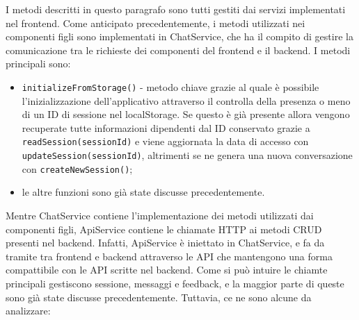 I metodi descritti in questo paragrafo sono tutti gestiti dai servizi implementati nel frontend.
Come anticipato precedentemente, i metodi utilizzati nei componenti figli sono implementati in ChatService, che ha il compito di gestire la comunicazione tra le richieste dei componenti del frontend e il backend. I metodi principali sono:
\begin{itemize}
    \item \texttt{initializeFromStorage()} - metodo chiave grazie al quale è possibile l'inizializzazione dell'applicativo attraverso il controlla della presenza o meno di un ID di sessione nel localStorage. Se questo è già presente allora vengono recuperate tutte informazioni dipendenti dal ID conservato grazie a \texttt{readSession(sessionId)} e viene aggiornata la data di accesso con \texttt{updateSession(sessionId)}, altrimenti se ne genera una nuova conversazione con \texttt{createNewSession()};
    \item le altre funzioni sono già state discusse precedentemente.
\end{itemize}
Mentre ChatService contiene l'implementazione dei metodi utilizzati dai componenti figli, ApiService contiene le chiamate HTTP ai metodi CRUD presenti nel backend. Infatti, ApiService è iniettato in ChatService, e fa da tramite tra frontend e backend attraverso le API che mantengono una forma compattibile con le API scritte nel backend. Come si può intuire le chiamte principali gestiscono sessione, messaggi e feedback, e la maggior parte di queste sono già state discusse precedentemente. Tuttavia, ce ne sono alcune da analizzare:
